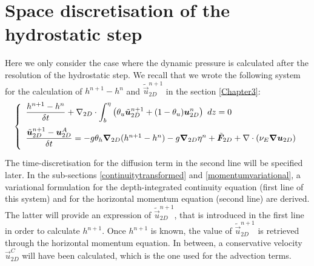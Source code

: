 \section{\label{etape hydrostatique}Space discretisation of the hydrostatic step}
Here we only consider the case where the dynamic pressure is calculated after the resolution of
the hydrostatic step. We recall that we wrote the following system for the calculation of $h^{n+1}-h^{n}$ and
$\tilde{\vec{u}}_{2D}^{n+1}$ in the section \ref{Chapter3}:
\begin{equation}
  \left\{\begin{array}{l}
    \dfrac{h^{n+1}-h^{n}}{\delta t}
    + \nabla_{2D}\cdot \displaystyle{\int_b^\eta\left(\theta_u\tilde{\vec{u}}_{2D}^{n+1}+(1-\theta_u)\vec{u}_{2D}^n\right)~dz}=0 \medskip \\
    \dfrac{\tilde{\vec{u}}_{2D}^{n+1}-\vec{u}_{2D}^{A}}{\delta t}=-g \theta_h \Grad_{2D}(h^{n+1}-h^n) -g\Grad_{2D}\eta^n
     + \tilde{\vec{F}}_{2D}
     +\Div(\nu_E \Grad \vec{u}_{2D}) \medskip \\
  \end{array}\right.
\label{eq:systeme_hydrostatique}
\end{equation}
The time-discretisation for the diffusion term in the second line will be specified later.
In the sub-sections \ref{continuitytransformed} and \ref{momentumvariational},
a variational formulation for the depth-integrated
continuity equation (first line of this system) and for the horizontal momentum equation (second line)
are derived. The latter will provide an expression of $\tilde{\vec{u}}_{2D}^{n+1}$,
that is introduced in the first line in order to calculate $h^{n+1}$.
Once $h^{n+1}$ is known, the value of $\tilde{\vec{u}}_{2D}^{n+1}$ is retrieved through the horizontal
momentum equation. In between, a conservative velocity $\vec{u}_{2D}^C$ will have been calculated,
which is the one used for the advection terms.

%


